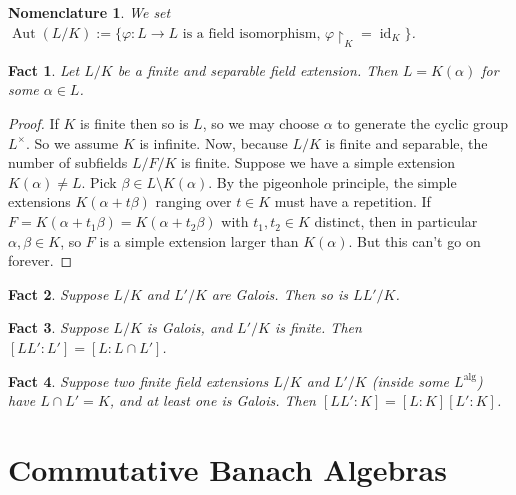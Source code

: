 \documentclass[12pt]{article}
\newtheorem*{fact*}{Fact}
\newtheorem*{nomn*}{Nomenclature}
\DeclareMathOperator{\alg}{alg}
\DeclareMathOperator{\aut}{Aut}
\DeclareMathOperator{\id}{id}
\newcommand{\too}{\longrightarrow}
\newcommand{\vphi}{\varphi}
\begin{document}
\begin{nomn*}
We set
$\aut(L/K) := \{\vphi: L\too L \text{ is a field isomorphism, } \vphi\restriction_{K} = \id_K\}$.
\end{nomn*}


\begin{fact*}
Let $L/K$ be a finite and separable field extension. Then $L=K(\alpha)$ for some $\alpha\in L$.
\end{fact*}


\begin{proof}
If $K$ is finite then so is $L$, so we may choose $\alpha$ to generate the cyclic group $L^\times$. So we assume $K$ is infinite. Now, because $L/K$ is finite and separable, the number of subfields $L/F/K$ is finite.
Suppose we have a simple extension $K(\alpha) \neq L$. Pick $\beta\in L\setminus K(\alpha)$. By the pigeonhole principle, the simple extensions $K(\alpha + t\beta)$ ranging over $t\in K$ must have a repetition. If $F=K(\alpha + t_1\beta) = K(\alpha + t_2\beta)$ with $t_1,t_2\in K$ distinct, then in particular $\alpha,\beta\in K$, so $F$ is a simple extension larger than $K(\alpha)$. But this can't go on forever.
\end{proof}


\begin{fact*}
Suppose $L/K$ and $L'/K$ are Galois. Then so is $LL'/K$.
\end{fact*}


\begin{fact*}
Suppose $L/K$ is Galois, and $L'/K$ is finite. Then $[LL' : L'] = [L : L\cap L']$.
\end{fact*}


\begin{fact*}
Suppose two finite field extensions $L/K$ and $L'/K$ (inside some $L^{\alg}$) have $L\cap L'=K$, and at least one is Galois. Then $[LL' : K] = [L:K][L':K]$.
\end{fact*}


\newpage
\section{Commutative Banach Algebras}
\end{document}
